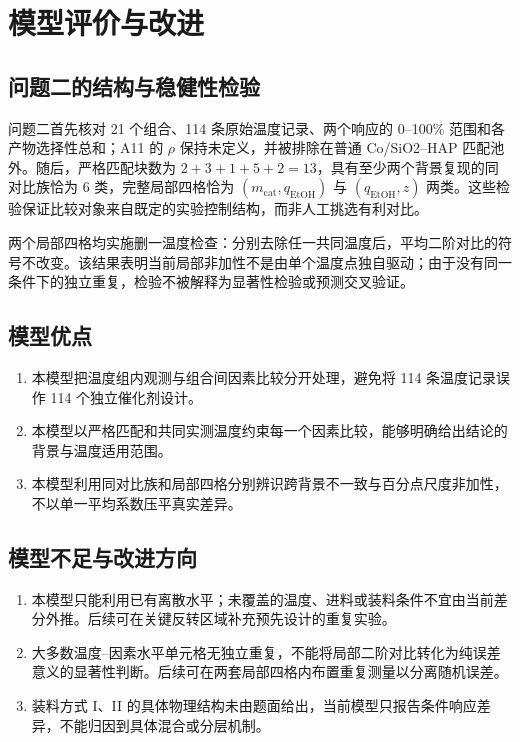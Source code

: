 \section{模型评价与改进}

\subsection{问题二的结构与稳健性检验}

问题二首先核对 21 个组合、114 条原始温度记录、两个响应的 0--100\% 范围和各产物选择性总和；A11 的 $\rho$ 保持未定义，并被排除在普通 Co/SiO2--HAP 匹配池外。随后，严格匹配块数为 $2+3+1+5+2=13$，具有至少两个背景复现的同对比族恰为 6 类，完整局部四格恰为 $(m_{\mathrm{cat}},q_{\mathrm{EtOH}})$ 与 $(q_{\mathrm{EtOH}},z)$ 两类。这些检验保证比较对象来自既定的实验控制结构，而非人工挑选有利对比。

两个局部四格均实施删一温度检查：分别去除任一共同温度后，平均二阶对比的符号不改变。该结果表明当前局部非加性不是由单个温度点独自驱动；由于没有同一条件下的独立重复，检验不被解释为显著性检验或预测交叉验证。

\subsection{模型优点}

\begin{enumerate}
  \item 本模型把温度组内观测与组合间因素比较分开处理，避免将 114 条温度记录误作 114 个独立催化剂设计。
  \item 本模型以严格匹配和共同实测温度约束每一个因素比较，能够明确给出结论的背景与温度适用范围。
  \item 本模型利用同对比族和局部四格分别辨识跨背景不一致与百分点尺度非加性，不以单一平均系数压平真实差异。
\end{enumerate}

\subsection{模型不足与改进方向}

\begin{enumerate}
  \item 本模型只能利用已有离散水平；未覆盖的温度、进料或装料条件不宜由当前差分外推。后续可在关键反转区域补充预先设计的重复实验。
  \item 大多数温度--因素水平单元格无独立重复，不能将局部二阶对比转化为纯误差意义的显著性判断。后续可在两套局部四格内布置重复测量以分离随机误差。
  \item 装料方式 I、II 的具体物理结构未由题面给出，当前模型只报告条件响应差异，不能归因到具体混合或分层机制。
\end{enumerate}
